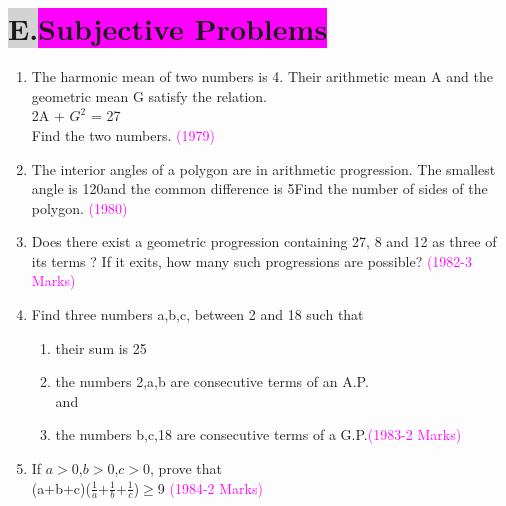 \documentclass[journal,12pt,twocolumn]{IEEEtran}
\theoremstyle{remark}
\begin{document}
\section*{\colorbox{lightgray}{E.}\colorbox{magenta}{Subjective Problems}}
\begin{enumerate}
    \item The harmonic mean of two numbers is 4. Their arithmetic mean A and the geometric mean G satisfy the relation.
    \\
    2A + $G^2$ = 27
    \\
    Find the two numbers.  \hfill\textcolor{magenta}{(1979)}

\item The interior angles of a polygon are in arithmetic progression. The smallest angle is 120\degree and the common difference is 5\degree Find the number of sides of the polygon. \hfill{\textcolor{magenta}{(1980)}}

    \item Does there exist a geometric progression containing 27, 8 and 12 as three of its terms ? If it exits, how many such progressions are possible?  \hfill\textcolor{magenta}{(1982-3 Marks)}

    \item Find three numbers a,b,c, between 2 and 18 such that
    \begin{enumerate}
    \item their sum is 25
    \item the numbers 2,a,b are consecutive terms of an A.P.
    \\
    and
    \item the numbers b,c,18 are consecutive terms of a G.P.\hfill\textcolor{magenta}{(1983-2 Marks)}
    \end{enumerate}
  

    \item If $a>0$,$b>0$,$c>0$, prove that
    \\
    (a+b+c)($\frac{1}{a}$+$\frac{1}{b}$+$\frac{1}{c}$)$\geq$9
    \hfill\textcolor{magenta}{(1984-2 Marks)}

\end{enumerate}
\end{document}
